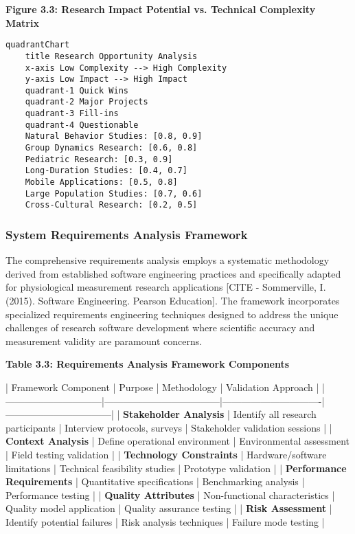 \documentclass[12pt,a4paper]{report}
\begin{document}
\textbf{Figure 3.3: Research Impact Potential vs. Technical Complexity Matrix}

\begin{verbatim}
quadrantChart
    title Research Opportunity Analysis
    x-axis Low Complexity --> High Complexity
    y-axis Low Impact --> High Impact
    quadrant-1 Quick Wins
    quadrant-2 Major Projects
    quadrant-3 Fill-ins
    quadrant-4 Questionable
    Natural Behavior Studies: [0.8, 0.9]
    Group Dynamics Research: [0.6, 0.8]
    Pediatric Research: [0.3, 0.9]
    Long-Duration Studies: [0.4, 0.7]
    Mobile Applications: [0.5, 0.8]
    Large Population Studies: [0.7, 0.6]
    Cross-Cultural Research: [0.2, 0.5]
\end{verbatim}

\subsubsection{System Requirements Analysis Framework}

The comprehensive requirements analysis employs a systematic methodology derived from established software engineering
practices and specifically adapted for physiological measurement research
applications [CITE - Sommerville, I. (2015). Software Engineering. Pearson Education]. The framework incorporates
specialized requirements engineering techniques designed to address the unique challenges of research software
development where scientific accuracy and measurement validity are paramount concerns.

\textbf{Table 3.3: Requirements Analysis Framework Components}

| Framework Component          | Purpose                            | Methodology                   | Validation Approach             |
|------------------------------|------------------------------------|-------------------------------|---------------------------------|
| \textbf{Stakeholder Analysis}     | Identify all research participants | Interview protocols, surveys  | Stakeholder validation sessions |
| \textbf{Context Analysis}         | Define operational environment     | Environmental assessment      | Field testing validation        |
| \textbf{Technology Constraints}   | Hardware/software limitations      | Technical feasibility studies | Prototype validation            |
| \textbf{Performance Requirements} | Quantitative specifications        | Benchmarking analysis         | Performance testing             |
| \textbf{Quality Attributes}       | Non-functional characteristics     | Quality model application     | Quality assurance testing       |
| \textbf{Risk Assessment}          | Identify potential failures        | Risk analysis techniques      | Failure mode testing            |
\end{document}
